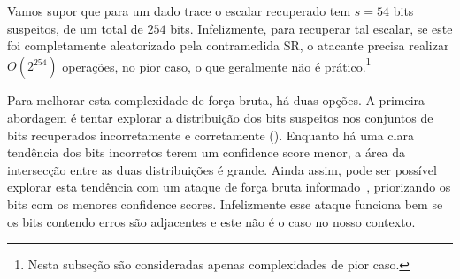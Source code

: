 \newcommand{\scalarlen}{254}

Vamos supor que para um dado trace o escalar recuperado tem $s=54$ bits suspeitos, de um total de $\scalarlen$ bits.
Infelizmente, para recuperar tal escalar, se este foi completamente aleatorizado pela contramedida SR, o atacante precisa realizar $O(2^{\scalarlen})$ operações, no pior caso, o que geralmente não é prático.\footnote{Nesta subseção são consideradas apenas complexidades de pior caso.}


Para melhorar esta complexidade de força bruta, há duas opções.
A primeira abordagem é tentar explorar a distribuição dos bits suspeitos nos conjuntos de bits recuperados incorretamente e corretamente (). Enquanto há uma clara tendência dos bits incorretos terem um confidence score menor, a área da intersecção entre as duas distribuições é grande.
Ainda assim, pode ser possível explorar esta tendência com um ataque de força bruta informado~\cite{LangeVredendaalWakker2014}, priorizando os bits com os menores confidence scores.
Infelizmente esse ataque funciona bem se os bits contendo erros são adjacentes e este não é o caso no nosso contexto.


